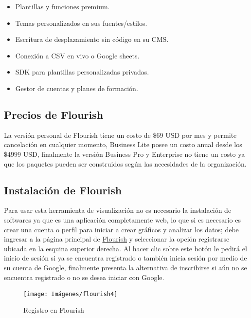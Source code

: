 \documentclass[
]{book}
\providecommand{\tightlist}{%
  \setlength{\itemsep}{0pt}\setlength{\parskip}{0pt}}
\begin{document}
\begin{itemize}
  \begin{itemize}
  \tightlist
  \item
    Plantillas y funciones premium.
  \item
    Temas personalizados en sus fuentes/estilos.
  \item
    Escritura de desplazamiento sin código en su CMS.
  \item
    Conexión a CSV en vivo o Google sheets.
  \item
    SDK para plantillas personalizadas privadas.
  \item
    Gestor de cuentas y planes de formación.
  \end{itemize}
\end{itemize}

\hypertarget{precios-de-flourish}{%
\subsection{Precios de Flourish}\label{precios-de-flourish}}

La versión personal de Flourish tiene un costo de \(\$69\) USD por mes y permite cancelación en cualquier momento, Business Lite posee un costo anual desde los \(\$4999\) USD, finalmente la versión Business Pro y Enterprise no tiene un costo ya que los paquetes pueden ser construidos según las necesidades de la organización.

\hypertarget{instalaciuxf3n-de-flourish}{%
\subsection{Instalación de Flourish}\label{instalaciuxf3n-de-flourish}}

Para usar esta herramienta de visualización no es necesario la instalación de softwares ya que es una aplicación completamente web, lo que si es necesario es crear una cuenta o perfil para iniciar a crear gráficos y analizar los datos; debe ingresar a la página principal de \href{https://flourish.studio/}{Flourish} y seleccionar la opción registrarse ubicada en la esquina superior derecha. Al hacer clic sobre este botón le pedirá el inicio de sesión si ya se encuentra registrado o también inicia sesión por medio de su cuenta de Google, finalmente presenta la alternativa de inscribirse si aún no se encuentra registrado o no se desea iniciar con Google.

\begin{figure}

{\centering \texttt{[image: Imágenes/flourish4]} 

}

\caption{Registro en Flourish}\label{fig:crearcuentaflourish-fig}
\end{figure}
\end{document}
